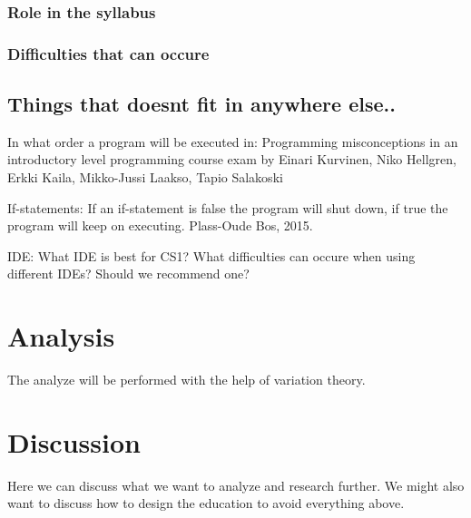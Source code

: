 \documentclass[twocolumn]{article}
\begin{document}
\subsubsection{Role in the syllabus}

\subsubsection{Difficulties that can occure}

\subsection{Things that doesnt fit in anywhere else..}

In what order a program will be executed in: Programming misconceptions in an introductory level programming course exam by Einari Kurvinen, Niko Hellgren, Erkki Kaila, Mikko-Jussi Laakso, Tapio Salakoski

If-statements: If an if-statement is false the program will shut down, if true the program will keep on executing. Plass-Oude Bos, 2015.

IDE: What IDE is best for CS1? What difficulties can occure when using different IDEs? Should we recommend one?


\section{Analysis}

The analyze will be performed with the help of variation theory. 

\section{Discussion}

Here we can discuss what we want to analyze and research further. We might also want to discuss how to design the education to avoid everything above.

\newpage
\end{document}
